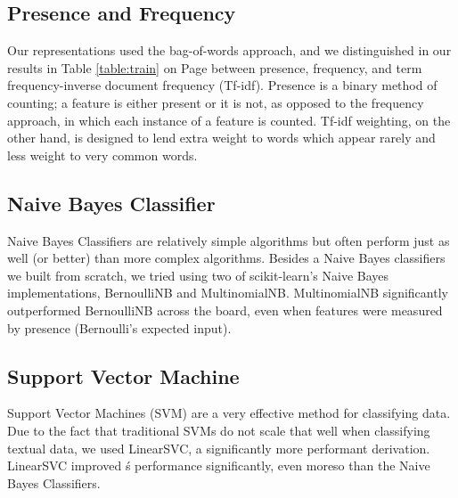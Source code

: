 \subsection{Presence and Frequency}
Our representations used the bag-of-words approach, and we distinguished in our results in Table \ref{table:train} on Page \pageref{table:train} between presence, frequency, and term frequency-inverse document frequency (Tf-idf). Presence is a binary method of counting; a feature is either present or it is not, as opposed to the frequency approach, in which each instance of a feature is counted. Tf-idf weighting, on the other hand, is designed to lend extra weight to words which appear rarely and less weight to very common words. 


\subsection{Naive Bayes Classifier}
Naive Bayes Classifiers are relatively simple algorithms but often perform just as well (or better) than more complex algorithms.  Besides a Naive Bayes classifiers we built from scratch, we tried using two of scikit-learn's Naive Bayes implementations, BernoulliNB and MultinomialNB. MultinomialNB significantly outperformed BernoulliNB across the board, even when features were measured by presence (Bernoulli's expected input).


\subsection{Support Vector Machine}
Support Vector Machines (SVM) are a very effective method for classifying data.  Due to the fact that traditional SVMs do not scale that well when classifying textual data, we used LinearSVC, a significantly more performant derivation.  LinearSVC improved \AlgName\'s performance significantly, even moreso than the Naive Bayes Classifiers.



